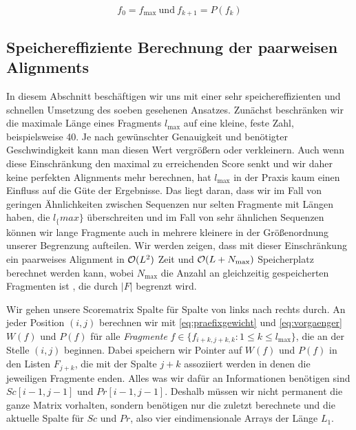 \begin{equation}\label{eq:backtracking}
	f_0 = f_{\max}\: \text{und}\: f_{k+1} = P(f_k)
\end{equation} 

\subsection{Speichereffiziente Berechnung der paarweisen Alignments}

In diesem Abschnitt beschäftigen wir uns mit einer sehr speichereffizienten und schnellen Umsetzung des soeben gesehenen Ansatzes. Zunächst beschränken wir die maximale Länge eines Fragments $l_{\max}$ auf eine kleine, feste Zahl, beispielsweise 40. Je nach gewünschter Genauigkeit und benötigter Geschwindigkeit kann man diesen Wert vergrößern oder verkleinern. Auch wenn diese Einschränkung den maximal zu erreichenden Score senkt und wir daher keine perfekten Alignments mehr berechnen, hat $l_{\max}$ in der Praxis kaum einen Einfluss auf die Güte der Ergebnisse. Das liegt daran, dass wir im Fall von geringen Ähnlichkeiten zwischen Sequenzen nur selten Fragmente mit Längen haben, die $l_\{max\}$ überschreiten und im Fall von sehr ähnlichen Sequenzen können wir lange Fragmente auch in mehrere kleinere in der Größenordnung unserer Begrenzung aufteilen. Wir werden zeigen, dass mit dieser Einschränkung ein paarweises Alignment in $\mathcal{O}(L^2)$ Zeit und $\mathcal{O}(L+N_{\max})$ Speicherplatz berechnet werden kann, wobei $N_{\max}$ die Anzahl an gleichzeitig gespeicherten Fragmenten ist \citep{m02}, die durch $|F|$ begrenzt wird.

Wir gehen unsere Scorematrix Spalte für Spalte von links nach rechts durch. An jeder Position $(i,j)$ berechnen wir mit \ref{eq:praefixgewicht} und \ref{eq:vorgaenger} $W(f)$ und $P(f)$ für alle \emph{Fragmente }$f \in \{f_{i+k,j+k,k} : 1 \leq k \leq l_{\max}\}$, die an der Stelle $(i,j)$ beginnen. Dabei speichern wir Pointer auf $W(f)$ und $P(f)$ in den Listen $F_{j+k}$, die mit der Spalte $j+k$ assoziiert werden in denen die jeweiligen Fragmente enden. Alles was wir dafür an Informationen benötigen sind $Sc[i\!-\!1,j\!-\!1]$ und $Pr[i\!-\!1,j\!-\!1]$. Deshalb müssen wir nicht permanent die ganze Matrix vorhalten, sondern benötigen nur die zuletzt berechnete und die aktuelle Spalte für $Sc$ und $Pr$, also vier eindimensionale Arrays der Länge $L_1$.



